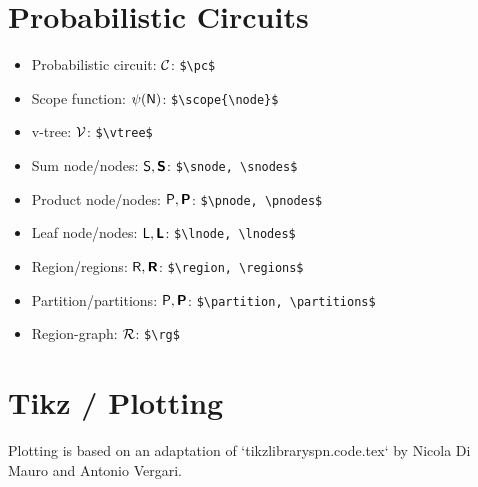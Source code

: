 \documentclass[11pt]{article}
\begin{document}
\section{Probabilistic Circuits}
\begin{itemize}
	\item Probabilistic circuit: $\mathcal{C}$: \verb!$\pc$!
	\item Scope function: $\psi(\mathsf{N})$: \verb!$\scope{\node}$!
	\item v-tree: $\mathcal{V}$: \verb!$\vtree$!
	\item Sum node/nodes: $\mathsf{S}, \bm{\mathsf{S}}$: \verb!$\snode, \snodes$!
	\item Product node/nodes: $\mathsf{P}, \bm{\mathsf{P}}$: \verb!$\pnode, \pnodes$!
	\item Leaf node/nodes: $\mathsf{L}, \bm{\mathsf{L}}$: \verb!$\lnode, \lnodes$!
	\item Region/regions: $\mathsf{R}, \bm{\mathsf{R}}$: \verb!$\region, \regions$!
	\item Partition/partitions: $\mathsf{P}, \bm{\mathsf{P}}$: \verb!$\partition, \partitions$!
	\item Region-graph: $\mathcal{R}$: \verb!$\rg$!
\end{itemize}

\section{Tikz / Plotting}
Plotting is based on an adaptation of `tikzlibraryspn.code.tex` by Nicola Di Mauro and Antonio Vergari.

\begin{figure}[h!]
\centering
{}
\end{figure}
\end{document}
